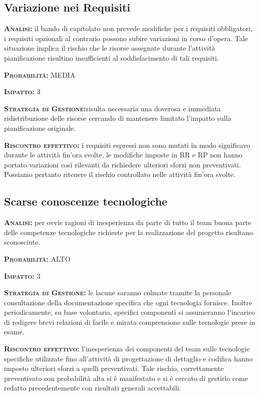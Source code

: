 \subsection{Variazione nei Requisiti}

\begin{description}
	\item{\scshape\bfseries Analisi:} il bando di capitolato non prevede modifiche per i requisiti obbligatori, i requisiti opzionali al contrario possono subire variazioni in corso d'opera. Tale situazione implica il rischio che le risorse assegnate durante l'attività pianificazione risultino insufficienti al soddisfacimento di tali requisiti.
	\item{\scshape\bfseries Probabilità:} MEDIA
	\item{\scshape\bfseries Impatto:} 3
	\item{\scshape\bfseries Strategia di Gestione:}risulta necessaria una doverosa e immediata ridistribuzione delle risorse cercando di mantenere limitato l'impatto sulla pianificazione originale.
	\item{\scshape\bfseries Riscontro effettivo:} i requisiti espressi non sono mutati in modo significavo durante le attività fin'ora svolte, le modifiche imposte in RR e RP non hanno portato variazioni così rilevanti da richiedere ulteriori sforzi non preventivati. Possiamo pertanto ritenere il rischio controllato nelle attività fin'ora svolte.
\end{description}

\subsection{Scarse conoscenze tecnologiche}
\begin{description}
	\item{\scshape\bfseries Analisi:} per ovvie ragioni di inesperienza da parte di tutto il team buona parte delle competenze tecnologiche richieste per la realizzazione del progetto risultano sconosciute.
	\item{\scshape\bfseries Probabilità:} ALTO
	\item{\scshape\bfseries Impatto:} 3
	\item{\scshape\bfseries Strategia di Gestione:} le lacune saranno colmate tramite la personale consultazione della documentazione specifica che ogni tecnologia fornisce. Inoltre periodicamente, su base volontaria, specifici componenti si assumeranno l'incarico di redigere brevi relazioni di facile e mirata comprensione sulle tecnologie prese in esame.
	\item{\scshape\bfseries Riscontro effettivo:} l'inesperienza dei componenti del team sulle tecnologie specifiche utilizzate fino all'attività di progettazione di dettaglio e codifica hanno imposto ulteriori sforzi a quelli preventivati. Tale rischio, correttamente preventivato con probabilità alta si è manifestato e si è cercato di gestirlo come redatto precedentemente con risultati generali accettabili. 
\end{description}


